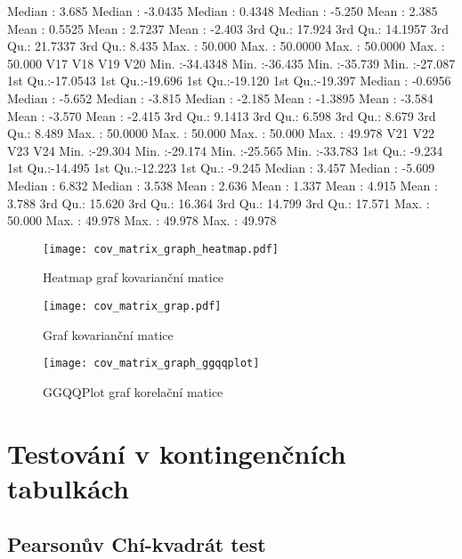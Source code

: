 \documentclass[a4paper, 12pt]{article}
\begin{document}
\begin{table}[H]
\begin{Schunk}
\begin{Soutput}
 Median :  3.685   Median : -3.0435   Median :  0.4348   Median : -5.250  
 Mean   :  2.385   Mean   :  0.5525   Mean   :  2.7237   Mean   : -2.403  
 3rd Qu.: 17.924   3rd Qu.: 14.1957   3rd Qu.: 21.7337   3rd Qu.:  8.435  
 Max.   : 50.000   Max.   : 50.0000   Max.   : 50.0000   Max.   : 50.000  
      V17                V18               V19               V20         
 Min.   :-34.4348   Min.   :-36.435   Min.   :-35.739   Min.   :-27.087  
 1st Qu.:-17.0543   1st Qu.:-19.696   1st Qu.:-19.120   1st Qu.:-19.397  
 Median : -0.6956   Median : -5.652   Median : -3.815   Median : -2.185  
 Mean   : -1.3895   Mean   : -3.584   Mean   : -3.570   Mean   : -2.415  
 3rd Qu.:  9.1413   3rd Qu.:  6.598   3rd Qu.:  8.679   3rd Qu.:  8.489  
 Max.   : 50.0000   Max.   : 50.000   Max.   : 50.000   Max.   : 49.978  
      V21               V22               V23               V24         
 Min.   :-29.304   Min.   :-29.174   Min.   :-25.565   Min.   :-33.783  
 1st Qu.: -9.234   1st Qu.:-14.495   1st Qu.:-12.223   1st Qu.: -9.245  
 Median :  3.457   Median : -5.609   Median :  6.832   Median :  3.538  
 Mean   :  2.636   Mean   :  1.337   Mean   :  4.915   Mean   :  3.788  
 3rd Qu.: 15.620   3rd Qu.: 16.364   3rd Qu.: 14.799   3rd Qu.: 17.571  
 Max.   : 50.000   Max.   : 49.978   Max.   : 49.978   Max.   : 49.978  
\end{Soutput}
\end{Schunk}
\end{table}

\begin{figure}[H]
\centering

\texttt{[image: cov\_matrix\_graph\_heatmap.pdf]}
\caption{Heatmap graf kovarianční matice}

\texttt{[image: cov\_matrix\_grap.pdf]}
\caption{Graf kovarianční matice}
\end{figure}

\begin{figure}[H]
\centering
\texttt{[image: cov\_matrix\_graph\_ggqqplot]}
\caption{GGQQPlot graf korelační matice}

\end{figure}

\section{Testování v kontingenčních tabulkách}
\subsection{Pearsonův Chí-kvadrát test}
\end{document}
